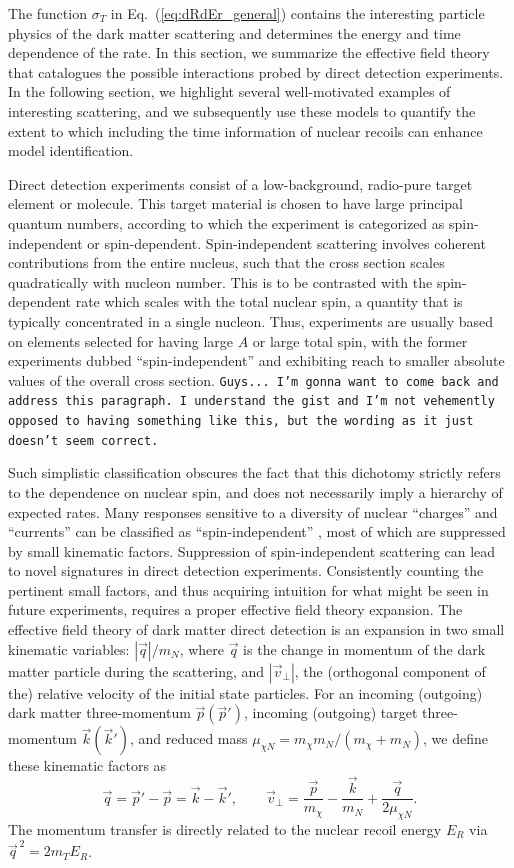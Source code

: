 \documentclass[11pt]{article}
\newcommand{\beq}{\begin{equation}} \newcommand{\eeq}{\end{equation}}
\newcommand{\Eq}[1]{Eq.~(\ref{#1})} \newcommand{\Eqs}[2]{Eqs.~(\ref{#1}) and (\ref{#2})} \newcommand{\Eqm}[2]{Eqs.~(\ref{#1}) through (\ref{#2})}
\newcommand{\sjwColor}{red}
\newcommand{\sjwtt}[1]{{\color{\sjwColor}\tt #1}}
\begin{document}
The function $\sigma_T$ in \Eq{eq:dRdEr_general} contains the interesting particle physics of the dark matter scattering and determines the energy and time dependence of the rate. In this section, we summarize the effective field theory that catalogues the possible interactions probed by direct detection experiments. In the following section, we highlight several well-motivated examples of interesting scattering, and we subsequently use these models to quantify the extent to which including the time information of nuclear recoils can enhance model identification.

Direct detection experiments consist of a low-background, radio-pure target element or molecule. This target material is chosen to have large principal quantum numbers, according to which the experiment is categorized as spin-independent or spin-dependent. Spin-independent scattering involves coherent contributions from the entire nucleus, such that the cross section scales quadratically with nucleon number. This is to be contrasted with the spin-dependent rate which scales with the total nuclear spin, a quantity that is typically concentrated in a single nucleon. Thus, experiments are usually based on elements selected for having large $A$ or large total spin, with the former experiments dubbed ``spin-independent'' and exhibiting reach to smaller absolute values of the overall cross section. \sjwtt{Guys... I'm gonna want to come back and address this paragraph. I understand the gist and I'm not vehemently opposed to having something like this, but the wording as it just doesn't seem correct.} 

Such simplistic classification obscures the fact that this dichotomy strictly refers to the dependence on nuclear spin, and does not necessarily imply a hierarchy of expected rates. Many responses sensitive to a diversity of nuclear ``charges'' and ``currents'' can be classified as ``spin-independent'' \cite{Fitzpatrick:2012ix}, most of which are suppressed by small kinematic factors. Suppression of spin-independent scattering can lead to novel signatures in direct detection experiments. Consistently counting the pertinent small factors, and thus acquiring intuition for what might be seen in future experiments, requires a proper effective field theory expansion. The effective field theory of dark matter direct detection \cite{Fitzpatrick:2012ix, Anand:2013yka} is an expansion in two small kinematic variables: $|\vec q|/m_N$, where $\vec q$ is the change in momentum of the dark matter particle during the scattering, and $|\vec v_\perp|$, the (orthogonal component of the) relative velocity of the initial state particles. For an incoming (outgoing) dark matter three-momentum $\vec p(\vec p')$, incoming (outgoing) target three-momentum $\vec k(\vec k')$, and reduced mass $\mu_{\chi N} = m_\chi m_N/(m_\chi +m_N)$, we define these kinematic factors as \cite{Fitzpatrick:2012ix}
\beq \label{eq:kinematic-definitions}
\vec q=\vec p'-\vec p=\vec k-\vec k', \qquad \vec v_\perp=\frac{\vec p}{m_\chi}-\frac{\vec k}{m_N}+\frac{\vec q}{2\mu_{\chi N}}.
\eeq
The momentum transfer is directly related to the nuclear recoil energy $E_R$ via $\vec{q}^{\, 2} =2m_TE_R$.
\end{document}
